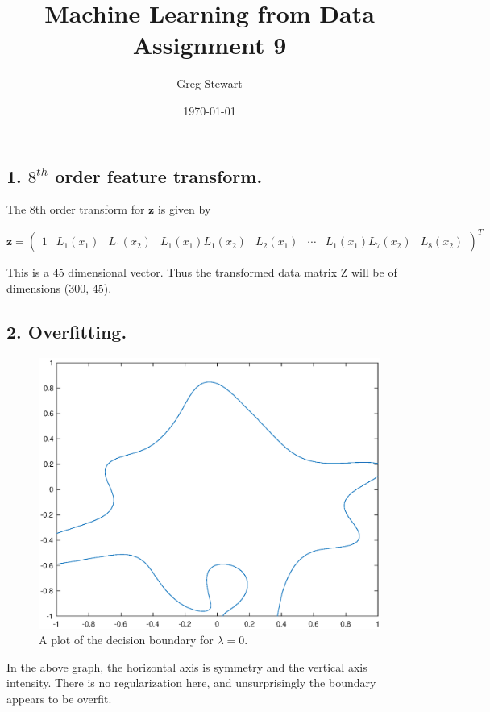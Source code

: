 \documentclass{article}
\title{Machine Learning from Data Assignment 9}
\author{Greg Stewart}
\date{\today}
\renewcommand{\vec}[1]{\mathbf{#1}}
\begin{document}
\maketitle

\subsection*{1. $8^{th}$ order feature transform.}

The 8th order transform for $\vec{z}$ is given by 

\[
  \vec{z} = 
  \begin{pmatrix}
    1 & L_1(x_1) & L_1(x_2) & L_1(x_1)L_1(x_2) & L_2(x_1) & \cdots & L_1(x_1)L_7(x_2) & L_8(x_2)
  \end{pmatrix}^T
\]

This is a 45 dimensional vector. Thus the transformed data matrix Z will be of dimensions 
(300, 45).

\subsection*{2. Overfitting.}

\begin{figure}[h!]
  \includegraphics[scale=.8]{over}
  \caption{A plot of the decision boundary for $\lambda = 0$.}
  \label{Fig 1.}
\end{figure}

In the above graph, the horizontal axis is symmetry and the vertical axis intensity. There is no
regularization here, and unsurprisingly the boundary appears to be overfit.
\end{document}
